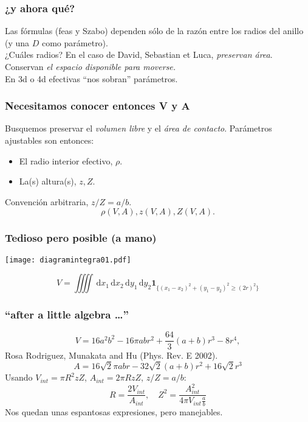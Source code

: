 \documentclass[mathserif,serif]{beamer}
\newcommand{\rd}{\, \mathrm{d}}
\newcommand{\indicator}[1]{\mathbf{1}_{ \{   #1 \} } }
\begin{document}
  \begin{frame}
    \frametitle{¿y ahora qué?}
    Las fórmulas (feas y Szabo) dependen sólo de la razón entre
    los radios del anillo (y una $D$ como parámetro). \\
    ¿Cuáles radios?
    En el caso de David, Sebastian et Luca, \emph{preservan área}.\\
    Conservan \emph{el espacio disponible para moverse.}    \\
    En 3d o 4d efectivas ``nos sobran'' parámetros. 
  \end{frame}
  

  \begin{frame}
    \frametitle{Necesitamos conocer entonces V y A}
    Busquemos preservar el \emph{volumen libre} y el 
    \emph{área de contacto}. Parámetros ajustables son
    entonces:
    \begin{itemize}
      \item El radio interior efectivo, $\rho$.
      \item La(s) altura(s), $z, Z$.
     \end{itemize}       
     Convención arbitraria, $z/Z=a/b$.
     \begin{equation}
     \rho(V,A), z(V,A), Z(V,A).  
     \end{equation}

   \end{frame}


  
  \begin{frame}
    \frametitle{Tedioso pero posible (a mano)} 
    \begin{center}
      \texttt{[image: diagramintegra01.pdf]}    
    \end{center}
    \begin{equation}
    V=\iiiint \rd x_1\rd x_2 \rd y_1 \rd y_2
    \indicator{(x_1-x_2)^2+(y_1-y_2)^2\ge (2r)^2}
    \end{equation}
  \end{frame}
   
  \begin{frame}
    \frametitle{``after a little algebra \ldots''}
    \begin{equation}\label{volumeabd}
      V %
      = 16 a^{2} b^{2}  
      - 16 \pi a b r^{2} 
      + \textstyle \frac{64}{3} (a+b) r^{3}  
      - 8 r^{4},
    \end{equation}
    Rosa Rodriguez, Munakata and Hu (Phys. Rev. E 2002).
    \begin{equation}\label{AreaChoque}
      A  =  16\sqrt{2}\pi a b r -32\sqrt{2} (a+b)r^2 +16 \sqrt{2}r^3 
    \end{equation}
    Usando $V_{int}=\pi R^2 z Z$, $A_{int}=2\pi R zZ$, $z/Z=a/b$:
    \begin{equation}
      R=\frac{2V_{int}}{A_{int}}, \quad  Z^2=\frac{A_{int}^2}{4\pi V_{int} \frac{a}{b}}
    \end{equation}
    Nos quedan unas espantosas expresiones, pero manejables.
  \end{frame}
\end{document}
